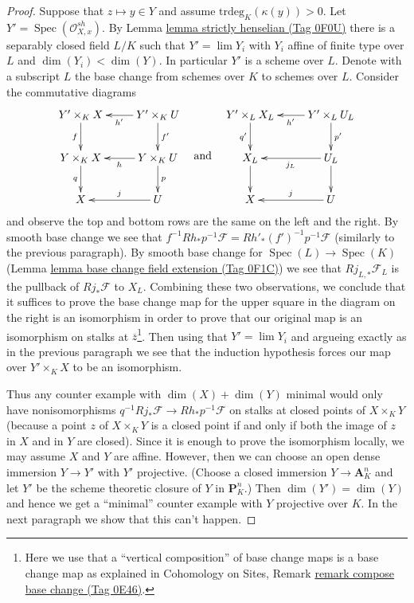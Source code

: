 \documentclass{amsart}
\theoremstyle{plain}
\theoremstyle{definition}
\theoremstyle{remark}
\numberwithin{equation}{subsection}
\def\lim{\mathop{\mathrm{lim}}\nolimits}
\def\Spec{\mathop{\mathrm{Spec}}}
\begin{document}
\begin{proof}
\medskip\noindent
Suppose that $z \mapsto y \in Y$ and assume $\text{trdeg}_K(\kappa(y)) > 0$.
Let $Y' = \Spec(\mathcal{O}_{X, x}^{sh})$.
By Lemma \href{https://stacks.math.columbia.edu/tag/0F0U}{lemma strictly henselian (Tag 0F0U)} there is a separably closed field
$L/K$ such that $Y' = \lim Y_i$ with $Y_i$ affine of finite type over $L$
and $\dim(Y_i) < \dim(Y)$. In particular $Y'$ is a scheme over $L$.
Denote with a subscript $L$ the base change from schemes over $K$
to schemes over $L$. Consider the commutative diagrams
$$
\vcenter{
\xymatrix{
Y' \times_K X \ar[d]_f  &
Y' \times_K U \ar[l]^{h'} \ar[d]^{f'} \\
Y \times_K X \ar[d]_q  &
Y \times_K U \ar[l]^h \ar[d]^p \\
X & U \ar[l]_j
}
}
\quad\text{and}\quad
\vcenter{
\xymatrix{
Y' \times_L X_L \ar[d]_{q'}  &
Y' \times_L U_L \ar[l]^{h'} \ar[d]^{p'} \\
X_L \ar[d] &
U_L \ar[l]^{j_L} \ar[d] \\
X & U \ar[l]_j
}
}
$$
and observe the top and bottom rows are the same on the left and the right.
By smooth base change we see that
$f^{-1}Rh_*p^{-1}\mathcal{F} = Rh'_*(f')^{-1}p^{-1}\mathcal{F}$
(similarly to the previous paragraph).
By smooth base change for $\Spec(L) \to \Spec(K)$
(Lemma \href{https://stacks.math.columbia.edu/tag/0F1C}{lemma base change field extension (Tag 0F1C)})
we see that $Rj_{L, *}\mathcal{F}_L$ is the pullback of
$Rj_*\mathcal{F}$ to $X_L$. Combining these two observations,
we conclude that it suffices to prove the base change map
for the upper square in the diagram on the right
is an isomorphism in order to prove that our original
map is an isomorphism on stalks at $\overline{z}$\footnote{Here we
use that a ``vertical composition'' of base change maps is a base change
map as explained in Cohomology on Sites, Remark
\href{https://stacks.math.columbia.edu/tag/0E46}{remark compose base change (Tag 0E46)}.}.
Then using that $Y' = \lim Y_i$ and argueing exactly
as in the previous paragraph we see that the induction
hypothesis forces our map over $Y' \times_K X$ to be
an isomorphism.

\medskip\noindent
Thus any counter example with $\dim(X) + \dim(Y)$ minimal
would only have nonisomorphisms
$q^{-1}Rj_*\mathcal{F} \to Rh_*p^{-1}\mathcal{F}$
on stalks at closed points of $X \times_K Y$ (because a point
$z$ of $X \times_K Y$ is a closed point if and only if
both the image of $z$ in $X$ and in $Y$ are closed).
Since it is enough to prove the isomorphism locally,
we may assume $X$ and $Y$ are affine. However, then
we can choose an open dense immersion $Y \to Y'$ with $Y'$
projective. (Choose a closed immersion $Y \to \mathbf{A}^n_K$
and let $Y'$ be the scheme theoretic closure of $Y$ in
$\mathbf{P}^n_K$.) Then $\dim(Y') = \dim(Y)$ and hence
we get a ``minimal'' counter example with $Y$ projective over $K$.
In the next paragraph we show that this can't happen.


\end{proof}
\end{document}
